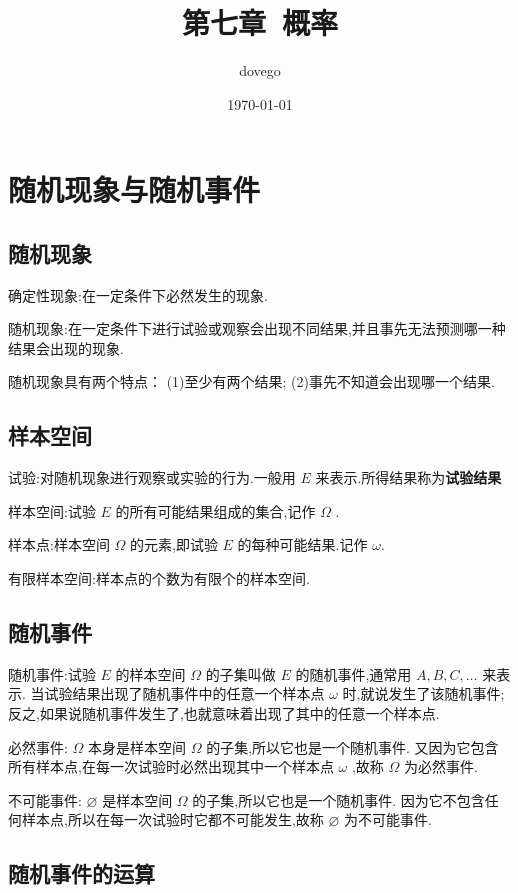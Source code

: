 \documentclass[titlepage]{ctexart}
\title{第七章~概率}
\author{dovego}
\date{\today}
\begin{document}
\maketitle


\section{随机现象与随机事件}

\subsection{随机现象}

确定性现象:在一定条件下必然发生的现象.

随机现象:在一定条件下进行试验或观察会出现不同结果,并且事先无法预测哪一种结果会出现的现象.

随机现象具有两个特点：
(1)至少有两个结果;
(2)事先不知道会出现哪一个结果.

\subsection{样本空间}

试验:对随机现象进行观察或实验的行为.一般用 $E$ 来表示.所得结果称为\textbf{试验结果}

样本空间:试验 $E$ 的所有可能结果组成的集合,记作 $\varOmega$ .

样本点:样本空间 $\varOmega$ 的元素,即试验 $E$ 的每种可能结果.记作 $\omega$.

有限样本空间:样本点的个数为有限个的样本空间.

\subsection{随机事件}

随机事件:试验 $E$ 的样本空间 $\varOmega$ 的子集叫做 $E$ 的随机事件,通常用 $A,B,C,\dots$ 来表示.
当试验结果出现了随机事件中的任意一个样本点 $\omega$ 时,就说发生了该随机事件;反之,如果说随机事件发生了,也就意味着出现了其中的任意一个样本点.

必然事件: $\varOmega$ 本身是样本空间 $\varOmega$ 的子集,所以它也是一个随机事件.
又因为它包含所有样本点,在每一次试验时必然出现其中一个样本点 $\omega$ ,故称 $\varOmega$ 为必然事件.

不可能事件: $\varnothing$ 是样本空间 $\varOmega$ 的子集,所以它也是一个随机事件.
因为它不包含任何样本点,所以在每一次试验时它都不可能发生,故称 $\varnothing$ 为不可能事件.

\subsection{随机事件的运算}
\end{document}
